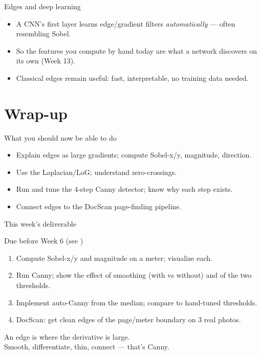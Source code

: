 \documentclass[10pt,aspectratio=169]{beamer}
\begin{document}
\begin{frame}{Edges and deep learning}
  \begin{itemize}
    \item A CNN's first layer learns edge/gradient filters \emph{automatically} — often resembling Sobel.
    \item So the features you compute by hand today are what a network discovers on its own (Week 13).
    \item Classical edges remain useful: fast, interpretable, no training data needed.
  \end{itemize}
\end{frame}

\section{Wrap-up}

\begin{frame}{What you should now be able to do}
  \begin{itemize}
    \item Explain edges as large gradients; compute Sobel-x/y, magnitude, direction.
    \item Use the Laplacian/LoG; understand zero-crossings.
    \item Run and tune the 4-step Canny detector; know why each step exists.
    \item Connect edges to the DocScan page-finding pipeline.
  \end{itemize}
\end{frame}

\begin{frame}{This week's deliverable}
  \begin{alertblock}{Due before Week 6 (see )}
    \begin{enumerate}
      \item Compute Sobel-x/y and magnitude on a meter; visualize each.
      \item Run Canny; show the effect of smoothing (with vs without) and of the two thresholds.
      \item Implement auto-Canny from the median; compare to hand-tuned thresholds.
      \item DocScan: get clean edges of the page/meter boundary on 3 real photos.
    \end{enumerate}
  \end{alertblock}
\end{frame}

\begin{frame}[standout]
  An edge is where the derivative is large.\\[4pt]
  \normalsize Smooth, differentiate, thin, connect — that's Canny.
\end{frame}
\end{document}
